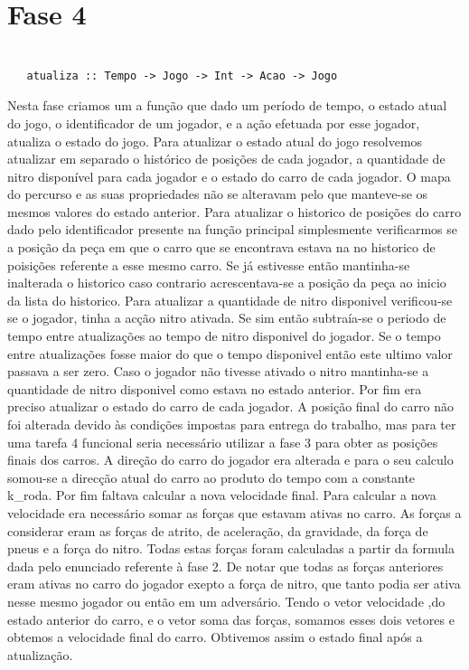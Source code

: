 \documentclass[a4paper]{report} %
\begin{document}
\section{Fase 4}

\begin{verbatim}

   atualiza :: Tempo -> Jogo -> Int -> Acao -> Jogo

\end{verbatim}
Nesta fase criamos um a função que dado um período de tempo, o estado atual do jogo, o identificador de um jogador, e a ação efetuada por esse jogador, atualiza o estado do jogo.
Para atualizar o estado atual do jogo resolvemos atualizar em separado o histórico de posições de cada jogador, a quantidade de nitro disponível para cada jogador e o estado do carro de cada jogador. O mapa do percurso e as suas propriedades não se alteravam pelo que manteve-se os mesmos valores do estado anterior.  Para atualizar o historico de posições do carro dado pelo identificador presente na função principal simplesmente verificarmos se a posição da peça em que o carro que se encontrava estava na no historico de poisições referente a esse mesmo carro. Se já estivesse então mantinha-se inalterada o historico caso contrario acrescentava-se a posição da peça ao inicio da lista do historico. Para atualizar a quantidade de nitro disponivel verificou-se se o jogador, tinha a acção nitro ativada. Se sim então subtraía-se o periodo de tempo entre atualizações ao tempo de nitro disponivel do jogador. Se o tempo entre atualizações fosse maior do que o tempo disponivel então este ultimo valor passava a ser zero. Caso o jogador não tivesse ativado o nitro mantinha-se a quantidade de nitro disponivel como estava no estado anterior. Por fim era preciso atualizar o estado do carro de cada jogador. A posição final do carro não foi alterada devido às condições impostas para entrega do trabalho, mas para ter uma tarefa 4 funcional seria necessário utilizar a fase 3 para obter as posições finais dos carros. A direção do carro do jogador era alterada e para o seu calculo somou-se a direcção atual do carro ao produto do tempo com a constante k_roda. Por fim faltava calcular a nova velocidade final. Para calcular a nova velocidade era necessário somar as forças que estavam ativas no carro. As forças a considerar eram as forças de atrito, de aceleração, da gravidade, da força de pneus e a força do nitro. Todas estas forças foram calculadas a partir da formula dada pelo enunciado referente à fase 2. De notar que todas as forças anteriores eram ativas no carro do jogador exepto a força de nitro, que tanto podia ser ativa nesse mesmo jogador ou então em um adversário. Tendo o vetor velocidade ,do estado anterior do carro, e o vetor soma das forças, somamos esses dois vetores e obtemos a velocidade final do carro. Obtivemos assim o estado final após a atualização.  
\end{document}
